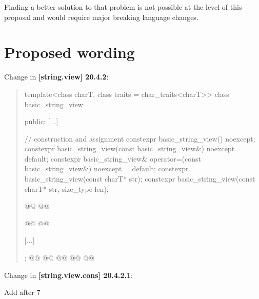 \documentclass{wg21}
\begin{document}
Finding a better solution to that problem is not possible at the level of this proposal and would require major breaking language changes.





\section{Proposed wording}

Change in \textbf{[string.view] 20.4.2}:
\begin{quote}
\begin{codeblock}

template<class charT, class traits = char_traits<charT>>
class basic_string_view {
public:
    [...]

    // construction and assignment
    constexpr basic_string_view() noexcept;
    constexpr basic_string_view(const basic_string_view&) noexcept = default;
    constexpr basic_string_view& operator=(const basic_string_view&) noexcept = default;
    constexpr basic_string_view(const charT* str);
    constexpr basic_string_view(const charT* str, size_type len);

    @@
    @@

    @@
    @@

    [...]
};
@@
@@
@@
@@
@@

\end{codeblock}
\end{quote}

Change in \textbf{[string.view.cons] 20.4.2.1}:

Add after 7
\end{document}

